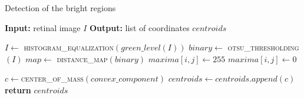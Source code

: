 \begin{algorithm}[!htbp]
	
	\caption{Detection of the bright regions}
	\label{alg:detectbrightregions}
	{\fontsize{10}{9.5}\selectfont	
	\begin{algorithmic}[1]
		\State \textbf{Input:} retinal image $I$ 
		\State \textbf{Output:} list of coordinates $centroids$
		\medbreak
		
			\State $I \gets$ \textsc{histogram\_equalization}$(green\_level(I))$
			\State $binary \gets$ \textsc{otsu\_thresholding}$(I)$
			\State $map \gets$ \textsc{distance\_map}$(binary)$
					\State $maxima[i,j] \gets 255$
				\Else
					\State $maxima[i,j] \gets 0$
				\EndIf
			\EndFor
			
				\State $c \gets $\textsc{center\_of\_mass}$(convex\_component)$
				\State $centroids \gets centroids.append(c)$
			\EndFor
			\State \textbf{return} $centroids$
		\EndFunction
		
	\end{algorithmic}
	}
\end{algorithm}